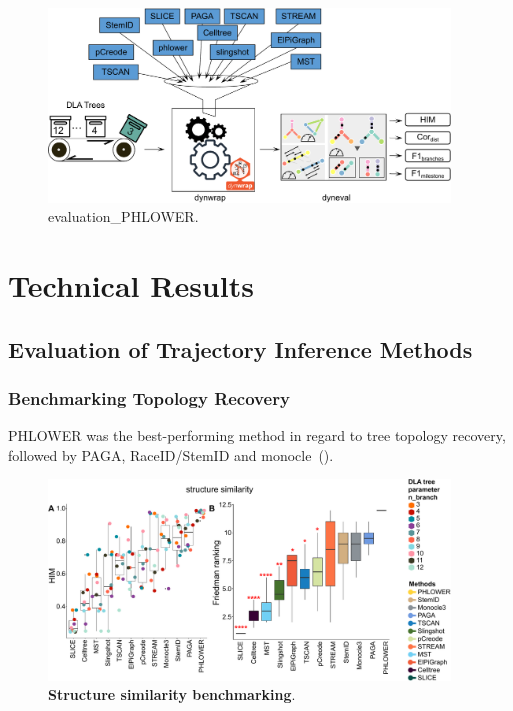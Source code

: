 \begin{figure}[!ht]
	\centering
	\includegraphics[width=0.95\textwidth]{evaluation_PHLOWER/fig}
	\vspace{0.1cm}
	\caption[evaluation\_PHLOWER]{
	evaluation\_PHLOWER.}
	\label{fig:evaluation_PHLOWER}
\end{figure}

\section{Technical Results}
\label{PHLOWER_bench:tech_out}
\subsection{Evaluation of Trajectory Inference Methods}

\subsubsection{Benchmarking Topology Recovery}
PHLOWER was the best-performing method in regard to tree topology recovery, followed by PAGA, RaceID/StemID and monocle~().
\begin{figure}[!h]
	\centering
	\includegraphics[width=0.95\textwidth]{HIM/fig}
	\vspace{0.1cm}
	\caption[Structure similarity benchmarking]{
	\textbf{Structure similarity benchmarking}.}
	\label{fig:HIM}
\end{figure}


